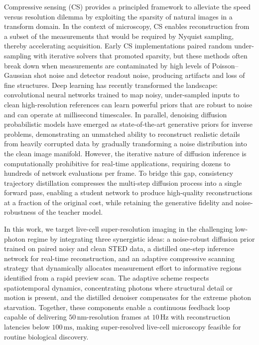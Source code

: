 \documentclass{article}
\begin{document}
Compressive sensing (CS) provides a principled framework to alleviate the speed versus resolution dilemma by exploiting the sparsity of natural images in a transform domain. In the context of microscopy, CS enables reconstruction from a subset of the measurements that would be required by Nyquist sampling, thereby accelerating acquisition. Early CS implementations paired random under-sampling with iterative solvers that promoted sparsity, but these methods often break down when measurements are contaminated by high levels of Poisson–Gaussian shot noise and detector readout noise, producing artifacts and loss of fine structures. Deep learning has recently transformed the landscape: convolutional neural networks trained to map noisy, under-sampled inputs to clean high-resolution references can learn powerful priors that are robust to noise and can operate at millisecond timescales. In parallel, denoising diffusion probabilistic models have emerged as state-of-the-art generative priors for inverse problems, demonstrating an unmatched ability to reconstruct realistic details from heavily corrupted data by gradually transforming a noise distribution into the clean image manifold. However, the iterative nature of diffusion inference is computationally prohibitive for real-time applications, requiring dozens to hundreds of network evaluations per frame. To bridge this gap, consistency trajectory distillation compresses the multi-step diffusion process into a single forward pass, enabling a student network to produce high-quality reconstructions at a fraction of the original cost, while retaining the generative fidelity and noise-robustness of the teacher model.

In this work, we target live-cell super-resolution imaging in the challenging low-photon regime by integrating three synergistic ideas: a noise-robust diffusion prior trained on paired noisy and clean STED data, a distilled one-step inference network for real-time reconstruction, and an adaptive compressive scanning strategy that dynamically allocates measurement effort to informative regions identified from a rapid preview scan. The adaptive scheme respects spatiotemporal dynamics, concentrating photons where structural detail or motion is present, and the distilled denoiser compensates for the extreme photon starvation. Together, these components enable a continuous feedback loop capable of delivering $50\,\text{nm}$-resolution frames at $10\,\text{Hz}$ with reconstruction latencies below $100\,\text{ms}$, making super-resolved live-cell microscopy feasible for routine biological discovery.
\end{document}

